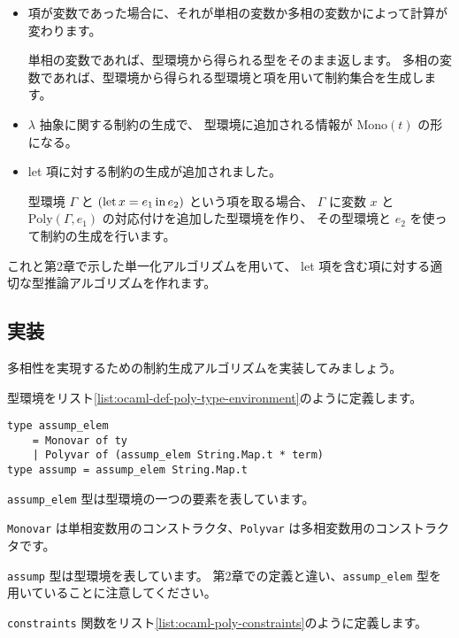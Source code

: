 \begin{itemize}
  \item 項が変数であった場合に、それが単相の変数か多相の変数かによって計算が変わります。

        単相の変数であれば、型環境から得られる型をそのまま返します。
        多相の変数であれば、型環境から得られる型環境と項を用いて制約集合を生成します。

  \item $\lambda$ 抽象に関する制約の生成で、
        型環境に追加される情報が $\mathrm{Mono}(t)$ の形になる。

  \item let 項に対する制約の生成が追加されました。

        型環境 $\Gamma$ と $(\mathrm{let} \, x = e_1 \, \mathrm{in} \, e_2)$ という項を取る場合、
        $\Gamma$ に変数 $x$ と $\mathrm{Poly}(\Gamma, e_1)$ の対応付けを追加した型環境を作り、
        その型環境と $e_2$ を使って制約の生成を行います。
\end{itemize}

これと第2章で示した単一化アルゴリズムを用いて、
let 項を含む項に対する適切な型推論アルゴリズムを作れます。

\subsection{実装}

多相性を実現するための制約生成アルゴリズムを実装してみましょう。

型環境をリスト\ref{list:ocaml-def-poly-type-environment}のように定義します。

\begin{lstlisting}[caption=型環境の定義, label=list:ocaml-def-poly-type-environment]
type assump_elem
    = Monovar of ty
    | Polyvar of (assump_elem String.Map.t * term)
type assump = assump_elem String.Map.t
\end{lstlisting}

\texttt{assump\_elem} 型は型環境の一つの要素を表しています。

\texttt{Monovar} は単相変数用のコンストラクタ、\texttt{Polyvar} は多相変数用のコンストラクタです。

\texttt{assump} 型は型環境を表しています。
第2章での定義と違い、\texttt{assump\_elem} 型を用いていることに注意してください。

\texttt{constraints} 関数をリスト\ref{list:ocaml-poly-constraints}のように定義します。

